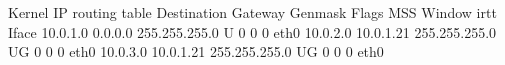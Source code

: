 Kernel IP routing table
Destination     Gateway         Genmask         Flags   MSS Window  irtt Iface
10.0.1.0        0.0.0.0         255.255.255.0   U         0 0          0 eth0
10.0.2.0        10.0.1.21       255.255.255.0   UG        0 0          0 eth0
10.0.3.0        10.0.1.21       255.255.255.0   UG        0 0          0 eth0

